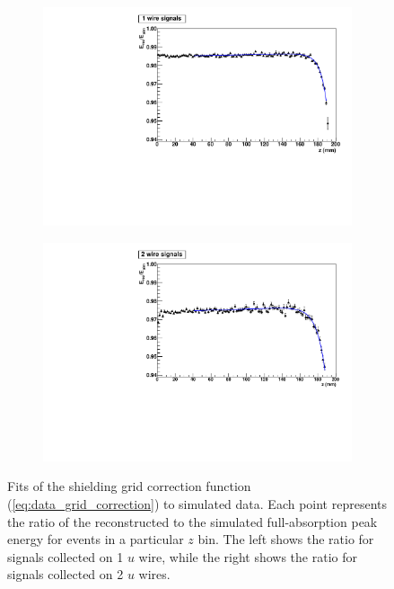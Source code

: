 \documentclass[herrin-thesis.tex]{subfiles}
\begin{document}
\begin{figure}[htbp]
\centering
	\begin{subfigure}[t]{0.48\textwidth}
		\centering
		\includegraphics[width=\textwidth]{./plots/data_grid_correction_Th1wire.pdf}
	\end{subfigure}\hfill%
	\begin{subfigure}[t]{0.48\textwidth}
		\centering
		\includegraphics[width=\textwidth]{./plots/data_grid_correction_Th2wire.pdf}
	\end{subfigure}
	\caption[Fits to determine the shielding grid correction parameters]{Fits of the shielding grid correction function (\cref{eq:data_grid_correction}) to simulated  data. Each point represents the ratio of the reconstructed to the simulated full-absorption peak energy for events in a particular \(z\) bin. The left shows the ratio for signals collected on 1 \(u\) wire, while the right shows the ratio for signals collected on 2 \(u\) wires.}
	\label{fig:data_grid_correction_fits}
\end{figure}
\end{document}
